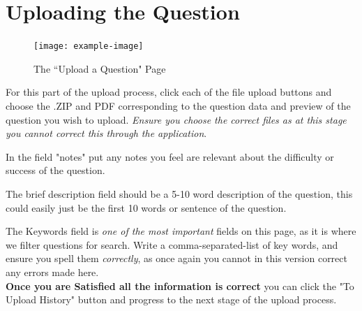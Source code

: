\documentclass[12pt, a4paper, titlepage]{book}
\begin{document}
\section{Uploading the Question}
\begin{figure}[htp]
\centering
\texttt{[image: example-image]}
\label{fig:upload}
\caption{The ``Upload a Question" Page}
\end{figure}
For this part of the upload process, click each of the file upload buttons and choose the .ZIP and PDF corresponding to the question data and preview of the question you wish to upload. \textit{Ensure you choose the correct files as at this stage you cannot correct this through the application}.\par
In the field "notes" put any notes you feel are relevant about the difficulty or success of the question.\par The brief description field should be a 5-10 word description of the question, this could easily just be the first 10 words or sentence of the question.\par The Keywords field is \textit{one of the most important} fields on this page, as it is where we filter questions for search. Write a comma-separated-list of key words, and ensure you spell them \textit{correctly}, as once again you cannot in this version correct any errors made here.
\\
\textbf{Once you are Satisfied all the information is correct} you can click the "To Upload History" button and progress to the next stage of the upload process.\pagebreak
\end{document}
